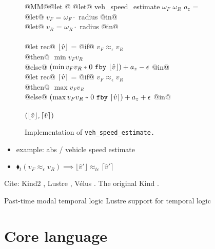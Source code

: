 \documentclass[sigplan,screen]{acmart}
\begin{document}
\begin{figure}
\begin{tabbing}
  @MM@\= @let @\= \kill
  @let@ veh\_speed\_estimate $\omega_F$ $\omega_R$ $a_z$ = \\
    \> @let@ $v_F$ = $\omega_F \cdot $ radius @in@ \\
    \> @let@ $v_R$ = $\omega_R \cdot $ radius @in@ \\
    \\
    \> @let rec@ $\lfloor \hat{v} \rfloor$ = @if@ $v_F \approx_\epsilon v_R$ \\
    \> \> @then@ $\min v_F v_R$ \\
    \> \> @else@ $(\xthen{\min v_F v_R}{\xfby{0}{\floor{\hat{v}}}}) + a_z - \epsilon$ @in@ \\
    \> @let rec@ $\lceil \hat{v} \rceil$ = @if@ $v_F \approx_\epsilon v_R$ \\
    \> \> @then@ $\max v_F v_R$ \\
    \> \> @else@ $(\xthen{\max v_F v_R}{\xfby{0}{\ceil{\hat{v}}}}) + a_z + \epsilon$ @in@ \\
    \\
    \> $(\lfloor \hat{v} \rfloor, \lceil \hat{v} \rceil)$
\end{tabbing}

\caption{Implementation of \tt{veh\_speed\_estimate}.}\label{f:veh-speed-estimate}
\end{figure}



\begin{itemize}
  \item example: abs / vehicle speed estimate
  \item $\blacklozenge_{t} (v_F \approx_{\epsilon} v_R) \implies \lfloor \hat{v}' \rfloor \approx_{t\epsilon} \lceil \hat{v}' \rceil$
\end{itemize}


Cite: Kind2 \cite{champion2016kind2}, Lustre \cite{caspi1995functional}, Vélus \cite{bourke2017formally}.
The original Kind \cite{hagen2008scaling}.


Past-time modal temporal logic \cite{lichtenstein1985glory}
Lustre support for temporal logic \cite{halbwachs1993executable}

\section{Core language}
\label{s:core}
\end{document}
